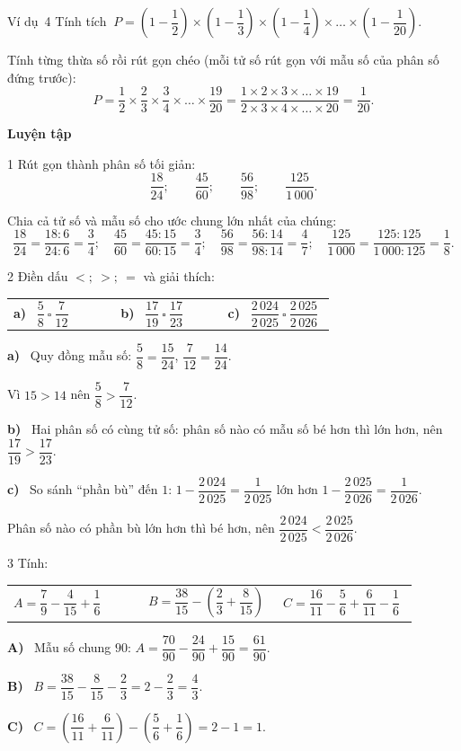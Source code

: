 \documentclass[11pt]{article}
\makeatletter
\newif\ifsol \solfalse
\renewcommand{\arraystretch}{1.35}
\newcommand{\guide}{\par\vspace{4pt}{\bfseries\color{tmBlue}\GuideWord}\par\vspace{3pt}\nopagebreak}
\newcommand{\probsol}[1]{%
  \begin{lrbox}{\solmeasure}\begin{minipage}{\dimexpr\linewidth-24pt\relax}#1\end{minipage}\end{lrbox}%
  \ifsol
    \begin{solbox}#1\end{solbox}%
  \else
    \setlength{\solht}{\dimexpr\ht\solmeasure+\dp\solmeasure+0.85cm\relax}%
    \ifdim\solht<1.35cm\setlength{\solht}{1.35cm}\fi
    \begin{tcolorbox}[colback=white,colframe=Line,boxrule=0.8pt,arc=5pt,
      left=8pt,right=8pt,top=4pt,bottom=4pt,height=\solht]{\footnotesize\color{Slate}\itshape\WorkWord}\end{tcolorbox}%
  \fi}
\newcommand{\dividerbar}[1]{\par\vspace{0.6em}\noindent
  \begin{tcolorbox}[enhanced,frame hidden,interior hidden,borderline west={5pt}{0pt}{ProbBlue},
    colback=white,left=12pt,right=12pt,top=5pt,bottom=5pt,arc=4pt]
  {\large\bfseries\color{ProbBlue} #1}\end{tcolorbox}\vspace{0.4em}}
\newcommand{\pa}[1]{\textbf{#1)}\ }
\newenvironment{cols3}{\par\vspace{3pt}\noindent\setlength{\tabcolsep}{0pt}\renewcommand{\arraystretch}{1.3}%
  \begin{tabular}{@{}>{\raggedright\arraybackslash\rule{0pt}{4.4ex}}p{0.32\linewidth}<{\rule[-2.3ex]{0pt}{0pt}}@{\hspace{0.015\linewidth}}>{\raggedright\arraybackslash\rule{0pt}{4.4ex}}p{0.32\linewidth}<{\rule[-2.3ex]{0pt}{0pt}}@{\hspace{0.015\linewidth}}>{\raggedright\arraybackslash\rule{0pt}{4.4ex}}p{0.32\linewidth}<{\rule[-2.3ex]{0pt}{0pt}}@{}}}%
  {\end{tabular}\par}
\newcommand{\gap}{\vspace{0.3cm}}
\def\GuideWord{Hướng dẫn giải.}
\def\WorkWord{Bài làm:}
\def\ExWord{Ví dụ}
\makeatother
\begin{document}
\gap
\begin{exbox}{\ExWord\ 4}
Tính tích $\ P=\left(1-\dfrac12\right)\times\left(1-\dfrac13\right)\times\left(1-\dfrac14\right)\times\dots\times\left(1-\dfrac1{20}\right)$.
\guide
Tính từng thừa số rồi rút gọn chéo (mỗi tử số rút gọn với mẫu số của phân số đứng trước):
\[P=\frac12\times\frac23\times\frac34\times\dots\times\frac{19}{20}=\frac{1\times2\times3\times\dots\times19}{2\times3\times4\times\dots\times20}=\frac1{20}.\]
\end{exbox}
\dividerbar{Luyện tập}
\begin{probbox}{1}{\relax}
Rút gọn thành phân số tối giản:
\[\frac{18}{24};\qquad\frac{45}{60};\qquad\frac{56}{98};\qquad\frac{125}{1\,000}.\]
\end{probbox}
\probsol{
Chia cả tử số và mẫu số cho ước chung lớn nhất của chúng:
\[\frac{18}{24}=\frac{18:6}{24:6}=\frac34;\quad\frac{45}{60}=\frac{45:15}{60:15}=\frac34;\quad\frac{56}{98}=\frac{56:14}{98:14}=\frac47;\quad\frac{125}{1\,000}=\frac{125:125}{1\,000:125}=\frac18.\]
}
\gap
\begin{probbox}{2}{\relax}
Điền dấu $<;\ >;\ =$ và giải thích:
\begin{cols3}
\pa{a} $\dfrac58\ \square\ \dfrac7{12}$ & \pa{b} $\dfrac{17}{19}\ \square\ \dfrac{17}{23}$ & \pa{c} $\dfrac{2\,024}{2\,025}\ \square\ \dfrac{2\,025}{2\,026}$
\end{cols3}
\end{probbox}
\probsol{
\pa{a} Quy đồng mẫu số: $\dfrac58=\dfrac{15}{24}$, $\dfrac7{12}=\dfrac{14}{24}$.\par Vì $15>14$ nên $\dfrac58>\dfrac7{12}$.\par
\pa{b} Hai phân số có cùng tử số: phân số nào có mẫu số bé hơn thì lớn hơn, nên $\dfrac{17}{19}>\dfrac{17}{23}$.\par
\pa{c} So sánh ``phần bù'' đến $1$: $1-\dfrac{2\,024}{2\,025}=\dfrac1{2\,025}$ lớn hơn $1-\dfrac{2\,025}{2\,026}=\dfrac1{2\,026}$.\par Phân số nào có phần bù lớn hơn thì bé hơn, nên $\dfrac{2\,024}{2\,025}<\dfrac{2\,025}{2\,026}$.
}
\gap
\begin{probbox}{3}{\relax}
Tính:
\begin{cols3}
$A=\dfrac79-\dfrac4{15}+\dfrac16$ & $B=\dfrac{38}{15}-\left(\dfrac23+\dfrac8{15}\right)$ & $C=\dfrac{16}{11}-\dfrac56+\dfrac6{11}-\dfrac16$
\end{cols3}
\end{probbox}
\probsol{
\pa{A} Mẫu số chung $90$: $A=\dfrac{70}{90}-\dfrac{24}{90}+\dfrac{15}{90}=\dfrac{61}{90}$.\par
\pa{B} $B=\dfrac{38}{15}-\dfrac8{15}-\dfrac23=2-\dfrac23=\dfrac43$.\par
\pa{C} $C=\left(\dfrac{16}{11}+\dfrac6{11}\right)-\left(\dfrac56+\dfrac16\right)=2-1=1$.
}
\end{document}
